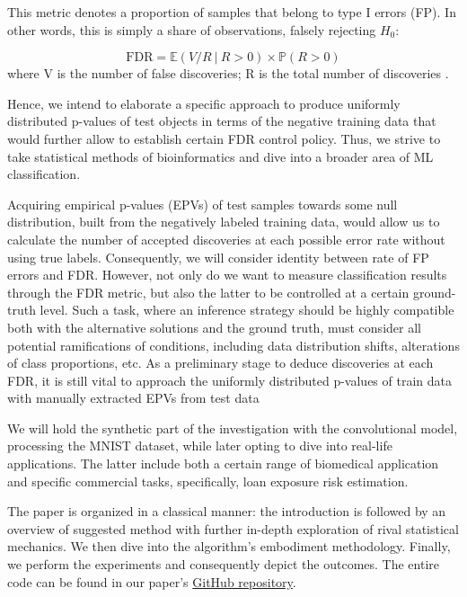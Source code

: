 \documentclass{article}
\begin{document}
This metric denotes a proportion of samples that belong to type I errors (FP). In other words, this is simply a share of observations, falsely rejecting  $H_0$:

\begin{equation}
            \text{FDR} = \mathbb{E}(V / R \ | \ R > 0) \times \mathbb{P}(R>0)
        \end{equation}
        where V is the number of false discoveries; R is the total number of discoveries \cite{BH}.

Hence, we intend to elaborate a specific approach to produce uniformly distributed p-values of test objects in terms of the negative training data that would further allow to establish certain FDR control policy. Thus, we strive to take statistical methods of bioinformatics and dive into a broader area of ML classification.

Acquiring empirical p-values (EPVs) of test samples towards some null distribution, built from the negatively labeled training data, would allow us to calculate the number of accepted discoveries at each possible error rate without using true labels. Consequently, we will consider identity between rate of FP errors and FDR. However, not only do we want to measure classification results through the FDR metric, but also the latter to be controlled at a certain ground-truth level. Such a task, where an inference strategy should be highly compatible both with the alternative solutions and the ground truth, must consider all potential ramifications of conditions, including data distribution shifts, alterations of class proportions, etc. As a preliminary stage to deduce discoveries at each FDR, it is still vital to approach the uniformly distributed p-values of train data with manually extracted EPVs from test data 

We will hold the synthetic part of the investigation with the convolutional model, processing the MNIST dataset, while later opting to dive into real-life applications. The latter include both a certain range of biomedical application and specific commercial tasks,  specifically, loan exposure risk estimation.

The paper is organized in a classical manner: the introduction is followed by an overview of suggested method with further in-depth exploration of rival  statistical mechanics.  We then dive into the algorithm's embodiment methodology.  Finally, we perform the experiments and consequently depict the outcomes. The entire code can be found in our paper’s \href{https://github.com/Aborevsky01/pvalues_classification}{GitHub repository}.
\end{document}
